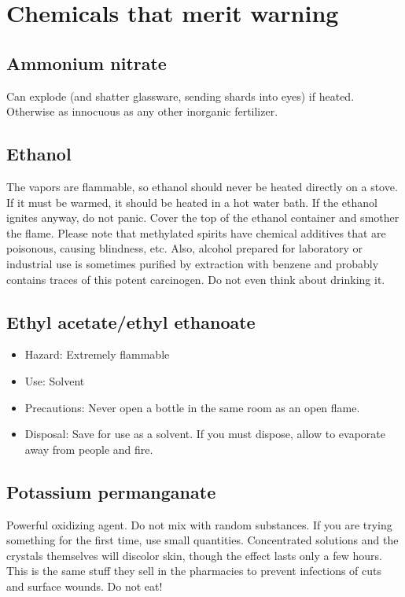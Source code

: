 \section{Chemicals that merit warning}
\subsection{Ammonium nitrate}
Can explode (and shatter glassware, sending shards into eyes) if heated. 
Otherwise as innocuous as any other inorganic fertilizer.

\subsection{Ethanol}
The vapors are flammable, 
so ethanol should never be heated directly on a stove. 
If it must be warmed, it should be heated in a hot water bath. 
If the ethanol ignites anyway, do not panic. 
Cover the top of the ethanol container and smother the flame. 
Please note that methylated spirits have chemical additives that are poisonous, 
causing blindness, etc. 
Also, alcohol prepared for laboratory or industrial use 
is sometimes purified by extraction with benzene 
and probably contains traces of this potent carcinogen. 
Do not even think about drinking it.

\subsection{Ethyl acetate/ethyl ethanoate}
\begin{itemize}
\item{Hazard: Extremely flammable}
\item{Use: Solvent}
\item{Precautions: Never open a bottle in the same room as an open flame.}
\item{Disposal: Save for use as a solvent. 
If you must dispose, allow to evaporate away from people and fire.}
\end{itemize}

\subsection{Potassium permanganate}
Powerful oxidizing agent. 
Do not mix with random substances. 
If you are trying something for the first time, use small quantities. 
Concentrated solutions and the crystals themselves will discolor skin, 
though the effect lasts only a few hours. 
This is the same stuff they sell in the pharmacies 
to prevent infections of cuts and surface wounds. 
Do not eat!

